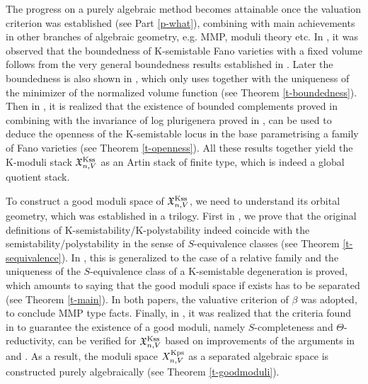 \documentclass[12pt,reqno]{amsart}%
\theoremstyle{definition}
\theoremstyle{remark}
\begin{document}
\medskip

The progress on a purely algebraic method becomes attainable once the valuation criterion was established (see Part \ref{p-what}), combining with main achievements in other branches of algebraic geometry, e.g. MMP, moduli theory etc. In \cite{Jia17}, it was observed that the boundedness of K-semistable Fano varieties with a fixed volume follows from the very general boundedness results established in \cite{Bir19, Bir16}. Later the boundedness is also shown in \cite{XZ20}, which only uses \cite{HMX14} together with the uniqueness of the minimizer of the normalized volume function (see Theorem \ref{t-boundedness}). Then in \cite{BLX19, Xu19}, it is realized that the existence of bounded complements proved in \cite{Bir19} combining with the invariance of log plurigenera proved in \cite{HMX13}, can be used to deduce the openness of the K-semistable locus in the base parametrising a family of Fano varieties (see Theorem \ref{t-openness}). All these results together yield the K-moduli stack $\mathfrak X^{\rm Kss}_{n,V}$ as an Artin stack of finite type, which is indeed a global quotient stack. 

To construct a good moduli space of $\mathfrak X^{\rm Kss}_{n,V}$, we need to understand its orbital geometry, which was established in a trilogy. First in \cite{LWX18}, we prove that the original definitions of K-semistability/K-polystability indeed coincide with the semistability/polystability in the sense of $S$-equivalence classes (see Theorem \ref{t-sequivalence}). In \cite{BX19}, this is generalized to the case of  a relative family and the uniqueness of the $S$-equivalence class of a K-semistable degeneration is proved, which amounts to saying that the good moduli space if exists has to be separated (see Theorem \ref{t-main}). In both papers, the valuative criterion of $\beta$ was adopted, to conclude MMP type facts. Finally, in \cite{ABHX19}, it was realized that the criteria found in \cite{AHH18}  to guarantee the existence of a good moduli, namely $S$-completeness and $\Theta$-reductivity,  can be verified for $\mathfrak X^{\rm Kss}_{n,V}$ based on improvements of the arguments in \cite{BX19} and \cite{LWX18}. As a result, the moduli space $X^{\rm Kps}_{n,V}$ as a separated algebraic space is constructed purely algebraically (see  Theorem \ref{t-goodmoduli}). 
\end{document}
